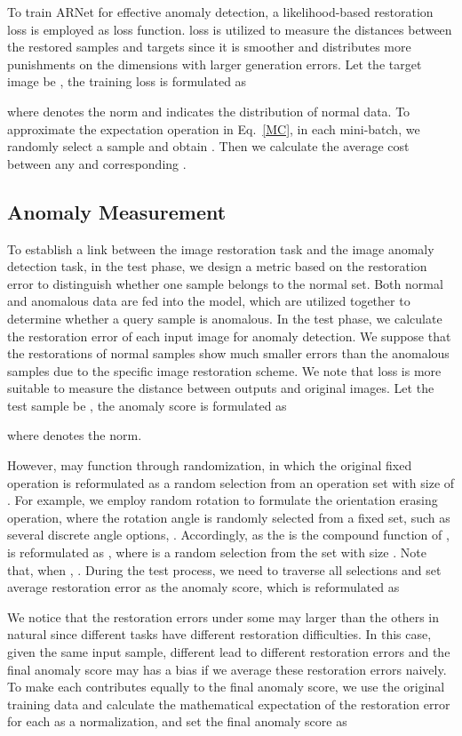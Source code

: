 \documentclass[journal]{IEEEtran}
\begin{document}
To train ARNet for effective anomaly detection, a likelihood-based restoration loss is employed as loss function.  loss is utilized to measure the distances between the restored samples and targets since it is smoother and distributes more punishments on the dimensions with larger generation errors. Let the target image be , the training loss is formulated as

where  denotes the  norm and  indicates the distribution of normal data. To approximate the expectation operation in Eq.~\eqref{MC}, in each mini-batch, we randomly select a sample  and obtain . Then we calculate the average cost between any  and corresponding .

\subsection{Anomaly Measurement}\label{sec:score}
To establish a link between the image restoration task and the image anomaly detection task, in the test phase, we design a metric based on the restoration error to distinguish whether one sample belongs to the normal set. Both normal and anomalous data are fed into the model, which are utilized together to determine whether a query sample is anomalous. 
In the test phase, we calculate the restoration error of each input image  for anomaly detection. We suppose that the restorations of normal samples show much smaller errors than the anomalous samples due to the specific image restoration scheme. We note that  loss is more suitable to measure the distance between outputs and original images. Let the test sample be , the anomaly score is formulated as

where  denotes the  norm. 

However,  may function through randomization, in which the original fixed operation is reformulated as a random selection  from an operation set   with size of . For example, we employ random rotation to formulate the orientation erasing operation, where the rotation angle is randomly selected from a fixed set, such as several discrete angle options, . Accordingly, as the  is the compound function of ,  is reformulated as , where  is a random selection from the set  with size .
Note that, when , . 
During the test process, we need to traverse all selections  and set average restoration error as the anomaly score, which is reformulated as


We notice that the restoration errors under some  may larger than the others in natural since different tasks have different restoration difficulties. In this case, given the same input sample, different  lead to different restoration errors and the final anomaly score may has a bias if we average these restoration errors naively. To make each  contributes equally to the final anomaly score, we use the original training data and calculate the mathematical expectation of the restoration error for each  as a normalization, and set the final anomaly score as
\end{document}
